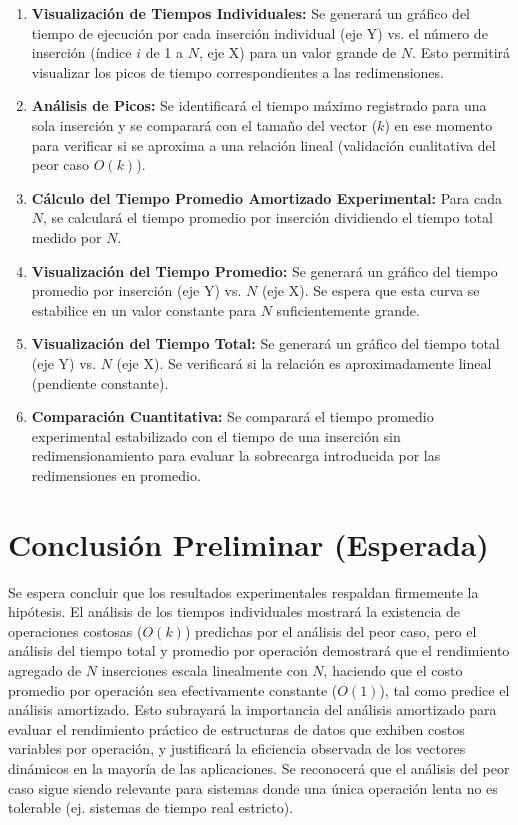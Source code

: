 \documentclass[11pt, a4paper]{article}
\begin{document}
\begin{enumerate}
    \item \textbf{Visualización de Tiempos Individuales:} Se generará un gráfico del tiempo de ejecución por cada inserción individual (eje Y) vs. el número de inserción (índice $i$ de 1 a $N$, eje X) para un valor grande de $N$. Esto permitirá visualizar los picos de tiempo correspondientes a las redimensiones.
    \item \textbf{Análisis de Picos:} Se identificará el tiempo máximo registrado para una sola inserción y se comparará con el tamaño del vector ($k$) en ese momento para verificar si se aproxima a una relación lineal (validación cualitativa del peor caso $O(k)$).
    \item \textbf{Cálculo del Tiempo Promedio Amortizado Experimental:} Para cada $N$, se calculará el tiempo promedio por inserción dividiendo el tiempo total medido por $N$.
    \item \textbf{Visualización del Tiempo Promedio:} Se generará un gráfico del tiempo promedio por inserción (eje Y) vs. $N$ (eje X). Se espera que esta curva se estabilice en un valor constante para $N$ suficientemente grande.
    \item \textbf{Visualización del Tiempo Total:} Se generará un gráfico del tiempo total (eje Y) vs. $N$ (eje X). Se verificará si la relación es aproximadamente lineal (pendiente constante).
    \item \textbf{Comparación Cuantitativa:} Se comparará el tiempo promedio experimental estabilizado con el tiempo de una inserción sin redimensionamiento para evaluar la sobrecarga introducida por las redimensiones en promedio.
\end{enumerate}

\section{Conclusión Preliminar (Esperada)}
Se espera concluir que los resultados experimentales respaldan firmemente la hipótesis. El análisis de los tiempos individuales mostrará la existencia de operaciones costosas ($O(k)$) predichas por el análisis del peor caso, pero el análisis del tiempo total y promedio por operación demostrará que el rendimiento agregado de $N$ inserciones escala linealmente con $N$, haciendo que el costo promedio por operación sea efectivamente constante ($O(1)$), tal como predice el análisis amortizado. Esto subrayará la importancia del análisis amortizado para evaluar el rendimiento práctico de estructuras de datos que exhiben costos variables por operación, y justificará la eficiencia observada de los vectores dinámicos en la mayoría de las aplicaciones. Se reconocerá que el análisis del peor caso sigue siendo relevante para sistemas donde una única operación lenta no es tolerable (ej. sistemas de tiempo real estricto).
\end{document}
